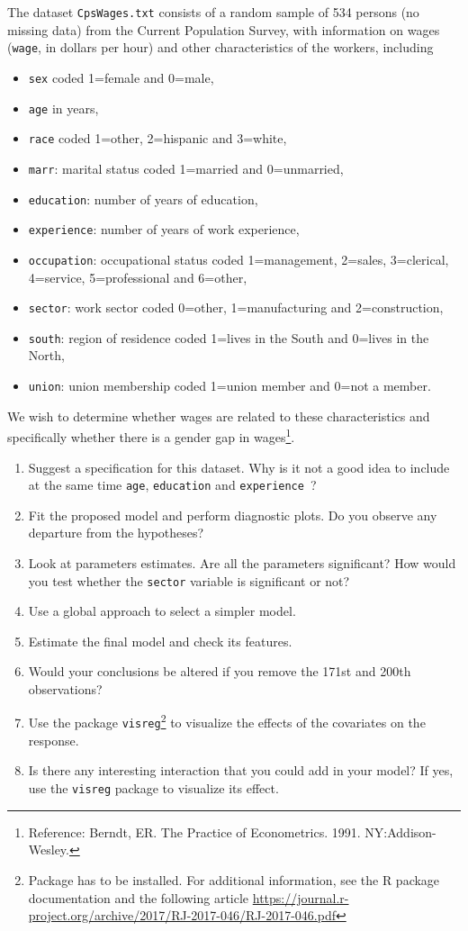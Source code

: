 \documentclass[a4paper,12pt]{article}\usepackage[]{graphicx}\usepackage[]{color}
\begin{document}
The dataset \verb"CpsWages.txt" consists of a random sample of 534 persons (no missing data) from the Current Population Survey, with information on wages (\texttt{wage}, in dollars per hour) and other characteristics of the workers, including
\begin{itemize}
\item{\texttt{sex} coded 1=female and 0=male,}
\item{\texttt{age} in years,}
\item{\texttt{race} coded 1=other, 2=hispanic and 3=white,}
\item{\texttt{marr}: marital status coded 1=married and 0=unmarried,}
\item{\texttt{education}: number of years of education,}
\item{\texttt{experience}: number of years of work experience,}
\item{\texttt{occupation}: occupational status coded 1=management, 2=sales, 3=clerical, 4=service, 5=professional and 6=other,}
\item{\texttt{sector}: work sector coded 0=other, 1=manufacturing and 2=construction,}
\item{\texttt{south}: region of residence coded 1=lives in the South and 0=lives in the North,}
\item{\texttt{union}: union membership coded 1=union member and 0=not a member.}
\end{itemize}
We wish to determine whether wages are related to these characteristics and specifically whether there is a gender gap in wages\footnote{Reference: Berndt, ER. The Practice of Econometrics. 1991. NY:Addison-Wesley.}.
\begin{enumerate}
\item{Suggest a specification for this dataset. Why is it not a good idea to include at the same time \verb"age", \verb"education" and \verb"experience"~?}
\item{Fit the proposed model and perform diagnostic plots. Do you observe any departure from the hypotheses?}
\item{Look at parameters estimates. Are all the parameters significant? How would you test whether the \verb"sector" variable is
significant or not?}
\item{Use a global approach to select a simpler model.}
\item{Estimate the final model and check its features.}
\item{Would your conclusions be altered if you remove the 171st and 200th observations?}
\item{Use the package \verb"visreg"\footnote{Package has to be installed. For additional information, see the R package documentation and the following article 
\url{https://journal.r-project.org/archive/2017/RJ-2017-046/RJ-2017-046.pdf}} to visualize the effects of the covariates on the response.}
\item{Is there any interesting interaction that you could add in your model? If yes, use the \verb"visreg" package to visualize its effect.}
\end{enumerate}
\end{document}
